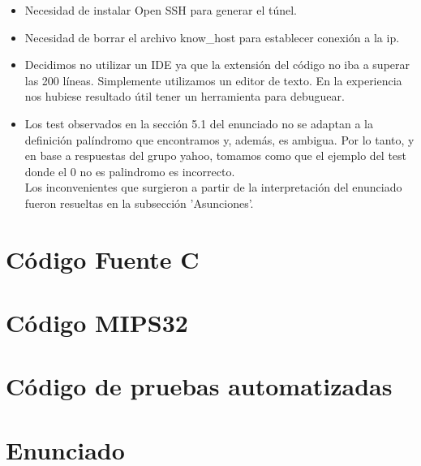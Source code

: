 \documentclass[a4paper,10pt]{article}
\begin{document}
\begin{itemize}
	\item Necesidad de instalar Open SSH para generar el t\'unel.
	\item Necesidad de borrar el archivo know\_host para establecer conexi\'on a la ip.
	\item Decidimos no utilizar un IDE ya que la extensi\'on del c\'odigo no iba a superar las 200 líneas. Simplemente utilizamos un editor de texto. En la experiencia nos hubiese resultado \'util tener un herramienta para debuguear.
	\item Los test observados en la secci\'on 5.1 del enunciado no se adaptan a la definici\'on palíndromo que encontramos y, además, es ambigua. Por lo tanto, y en base a respuestas del grupo yahoo, tomamos como que el ejemplo del test donde el 0 no es palindromo es incorrecto.\\
	Los inconvenientes que surgieron a partir de la interpretaci\'on del enunciado fueron resueltas en la subsecci\'on 'Asunciones'.
\end{itemize}

\newpage
\section{C\'odigo Fuente C}


\newpage
\section{C\'odigo MIPS32}


\newpage
\section{C\'odigo de pruebas automatizadas}


\newpage
\section{Enunciado}


\end{document}
